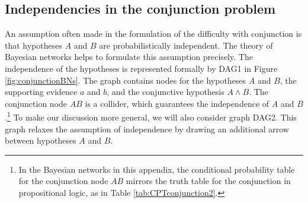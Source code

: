 \documentclass[
  10pt,
  dvipsnames,enabledeprecatedfontcommands]{scrartcl}
\begin{document}
\hypertarget{independencies-in-the-conjunction-problem}{%
\subsection*{Independencies in the conjunction
problem}\label{independencies-in-the-conjunction-problem}}

An assumption often made in the formulation of the difficulty with
conjunction is that hypotheses \(A\) and \(B\) are probabilistically
independent. The theory of Bayesian networks helps to formulate this
assumption precisely. The independence of the hypotheses is represented
formally by \textsf{DAG1} in Figure \ref{fig:conjunctionBNs}. The graph
contains nodes for the hypotheses \(A\) and \(B\), the supporting
evidence \(a\) and \(b\), and the conjunctive hypothesis \(A\wedge B\).
The conjunction node \(AB\) is a collider, which guarantees the
independence of \(A\) and \(B\).\footnote{In the Bayesian networks in
  this appendix, the conditional probability table for the conjunction
  node \(AB\) mirrors the truth table for the conjunction in
  propositional logic, as in Table \ref{tab:CPTconjunction2}.} To make
our discussion more general, we will also consider graph \textsf{DAG2}.
This graph relaxes the assumption of independence by drawing an
additional arrow between hypotheses \(A\) and \(B\).

\vspace{1mm}
\footnotesize

\normalsize
\end{document}
